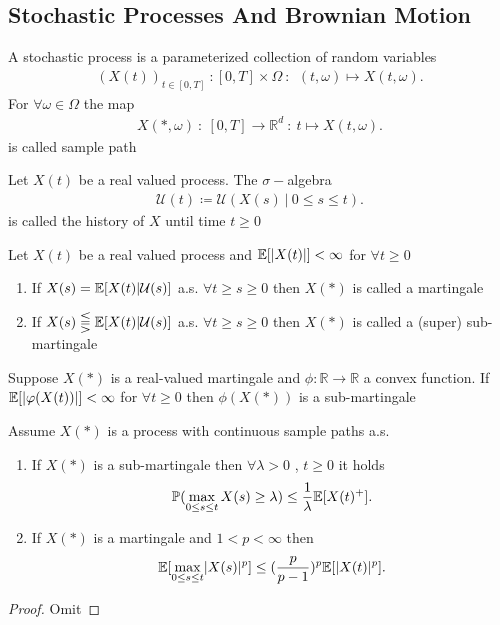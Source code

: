 \subsection{Stochastic Processes And Brownian Motion}
\begin{definition}
 A stochastic process is a parameterized collection of random variables 
 \begin{align*}
   (X(t))_{t \in [0,T]} \ : [0,T] \times \Omega  \ : \ \ (t,\omega ) \mapsto X(t,\omega )
 .\end{align*}
 For $\forall  \omega  \in  \Omega $ the map 
 \begin{align*}
   X(*,\omega ) \ : \ [0,T] \to \mathbb{R}^{d}  \ : \ t \mapsto X(t,\omega )
 .\end{align*}
 is called sample path
\end{definition}
\begin{definition}[History]
 Let $X(t)$ be a real valued process. The $\sigma-$algebra 
 \begin{align*}
  \mathcal{U}(t) \coloneqq  \mathcal{U}(X(s) \ | \ 0\le s\le t)
 .\end{align*}
 is called the history of $X$ until time $t\ge 0$
\end{definition}
\begin{definition}[Martingale]
  Let $X(t)$ be a real valued process and $\mathbb{E}[\lvert X(t)\rvert] < \infty$  for $\forall t \ge 0$
  \begin{enumerate}
    \item If $X(s) = \mathbb{E}[X(t)|\mathcal{U}(s)]$ a.s. $\forall  t \ge  s \ge  0$  then $X(*)$ is called a martingale
    \item If $X(s) \lesseqqgtr  \mathbb{E}[X(t)|\mathcal{U}(s)]$ a.s. $\forall  t \ge  s \ge  0$  then $X(*)$ is called a (super) sub-martingale
  \end{enumerate}
\end{definition}
\begin{lemma}
  Suppose $X(*)$ is a real-valued martingale and $\phi  : \mathbb{R} \to  \mathbb{R}$ a convex function.
  If $\mathbb{E}[\lvert\varphi(X(t))\rvert] < \infty $ for $\forall  t\ge 0$ then $\phi(X(*))$ is a sub-martingale
\end{lemma}
\begin{theorem}
 Assume $X(*)$  is a process with continuous sample paths a.s. 
 \begin{enumerate}
   \item If $X(*)$ is a sub-martingale then $\forall  \lambda > 0$ , $t \ge 0$ it holds 
     \begin{align*}
       \mathbb{P}(\max_{0\le s\le t} X(s) \ge \lambda ) \le  \frac{1}{\lambda }\mathbb{E}[X(t)^{+} ]
     .\end{align*}
    \item If $X(*)$ is a martingale and $1 < p < \infty$ then
      \begin{align*}
        \mathbb{E}[\max_{0\le s\le t} \lvert X(s) \rvert^{p} ] \le (\frac{p}{p-1})^{p} \mathbb{E}[\lvert X(t)\rvert^{p} ]
      .\end{align*}
 \end{enumerate}
\end{theorem}
\begin{proof}
 Omit 
\end{proof}
